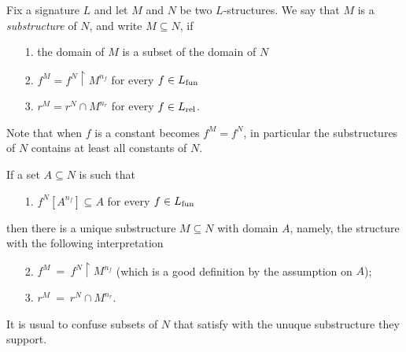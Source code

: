 \def\medrel#1{\parbox[t]{6ex}{$\displaystyle\hfil #1$}}
\def\ceq#1#2#3{\parbox{10ex}{$\displaystyle #1$}\medrel{#2}$\displaystyle  #3$}


\begin{definition}\label{sottostrutturadef}
Fix a signature $L$ and let $M$ and $N$ be two $L$-structures. We say that $M$ is a \emph{substructure\/} of $N$, and write \emph{$M\subseteq N$}, if
\begin{itemize}
\item[1.] the domain of $M$ is a subset of the domain of $N$
\item[2.] $f^M=f^N\restriction M^{n_f}$ for every $f\in L_{\rm fun}$
\item[3.] $r^M=r^N\cap M^{n_r}$ for every $f\in L_{\rm rel}$.
\end{itemize}
\end{definition}

Note that when $f$ is a constant  becomes $f^M=f^N$, in particular the substructures of $N$ contains at least all constants of $N$.

If a set $A\subseteq N$ is such that 
\begin{itemize}
\item[1.] $f^N[A^{n_f}]\subseteq A$ for every  $f\in L_{\rm fun}$ 
\end{itemize}
then there is a unique substructure $M\subseteq N$ with domain $A$, namely, the structure with the following interpretation
\begin{itemize}
\item[2.] $f^M\ =\ f^N\restriction M^{n_f}$ (which is a good definition by the assumption on $A$);
\item[3.] $r^M\ =\ r^N\cap M^{n_r}$.
\end{itemize}
It is usual to confuse subsets of $N$ that satisfy  with the unuque substructure they support.

